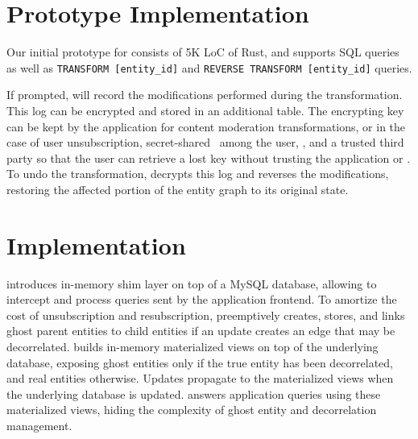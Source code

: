 \section{Prototype Implementation}
\label{sec:proto}
Our initial prototype for \sys consists of 5K LoC of Rust, and supports SQL queries as well as \texttt{TRANSFORM [entity\_id]} and \texttt{REVERSE TRANSFORM [entity\_id]} queries.

If prompted, \sys will record the modifications performed during the transformation. This log can be
encrypted and stored in an additional table. The encrypting key can be kept by the application for
\eg content moderation transformations, or in the case of user unsubscription,
secret-shared~\cite{secretsharing} among the user, \sys, and a trusted third party so that the user
can retrieve a lost key without trusting the application or \sys. To undo the transformation, \sys
decrypts this log and reverses the modifications, restoring the affected portion of the entity graph
to its original state.

\iffalse
\section{Implementation}

\name introduces in-memory shim layer on top of a MySQL database, 
allowing \name to intercept and process queries sent by the application frontend. 
To amortize the cost of unsubscription and resubscription, \name preemptively creates, stores, and
links ghost parent entities to child entities if an update creates an edge that may be decorrelated.
\name builds in-memory materialized views on top of the underlying database, exposing ghost
entities only if the true entity has been decorrelated, and real entities otherwise. Updates
propagate to the materialized views when the underlying database is updated. \name answers
application queries using these materialized views, hiding the complexity of ghost entity and
decorrelation management.

